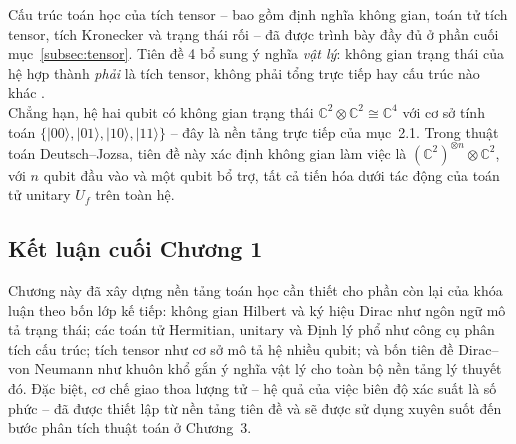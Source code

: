 \begin{remark}
Cấu trúc toán học của tích tensor -- bao gồm định nghĩa không gian, toán tử tích
tensor, tích Kronecker và trạng thái rối -- đã được trình bày đầy đủ ở phần cuối
mục~\ref{subsec:tensor}. Tiên đề 4 bổ sung ý nghĩa \emph{vật lý}: không gian trạng thái của hệ hợp thành \emph{phải} là tích
tensor, không phải tổng trực tiếp hay cấu trúc nào khác \cite{ref5}.\\
Chẳng hạn, hệ
hai qubit có không gian trạng thái $\mathbb{C}^2 \otimes \mathbb{C}^2 \cong
\mathbb{C}^4$ với cơ sở tính toán $\{|00\rangle, |01\rangle, |10\rangle,
|11\rangle\}$ -- đây là nền tảng trực tiếp của mục~2.1. Trong thuật toán
Deutsch--Jozsa, tiên đề này xác định không gian làm việc là $(\mathbb{C}^2)^{\otimes
n} \otimes \mathbb{C}^2$, với $n$ qubit đầu vào và một qubit bổ trợ, tất cả tiến hóa
dưới tác động của toán tử unitary $U_f$ trên toàn hệ.
\end{remark}

\subsection*{Kết luận cuối Chương 1}
Chương này đã xây dựng nền tảng toán học cần thiết cho phần còn lại của
khóa luận theo bốn lớp kế tiếp: không gian Hilbert và ký hiệu Dirac như
ngôn ngữ mô tả trạng thái; các toán tử Hermitian, unitary và Định lý phổ
như công cụ phân tích cấu trúc; tích tensor như cơ sở mô tả hệ nhiều
qubit; và bốn tiên đề Dirac--von Neumann như khuôn khổ gắn ý nghĩa vật lý
cho toàn bộ nền tảng lý thuyết đó. Đặc biệt, cơ chế giao thoa lượng tử -- hệ quả của
việc biên độ xác suất là số phức -- đã được thiết lập từ nền tảng tiên đề
và sẽ được sử dụng xuyên suốt đến bước phân tích thuật toán ở Chương~3.